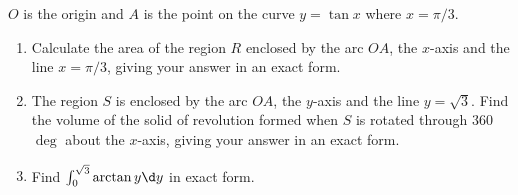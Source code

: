 \begin{problem}
    $O$ is the origin and $A$ is the point on the curve $y = \tan x$ where $x = \pi/3$.

    \begin{enumerate}
        \item Calculate the area of the region $R$ enclosed by the arc $OA$, the $x$-axis and the line $x = \pi/3$, giving your answer in an exact form.
        \item The region $S$ is enclosed by the arc $OA$, the $y$-axis and the line $y = \sqrt3$. Find the volume of the solid of revolution formed when $S$ is rotated through 360$\deg$ about the $x$-axis, giving your answer in an exact form.
        \item Find $\int_0^{\sqrt3} \arctan y \d y$ in exact form.
    \end{enumerate}
\end{problem}
